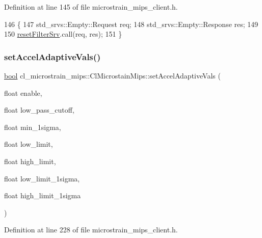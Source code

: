 Definition at line 145 of file microstrain\+\_\+mips\+\_\+client.\+h.


\begin{DoxyCode}
146     \{
147         std\_srvs::Empty::Request req;
148         std\_srvs::Empty::Response res;
149 
150         \hyperlink{classcl__microstrain__mips_1_1ClMicrostainMips_a3d9eb5c291d70a2fb1b9bde4392e1d48}{resetFilterSrv}.call(req, res);
151     \}
\end{DoxyCode}
\mbox{\label{classcl__microstrain__mips_1_1ClMicrostainMips_a4687c5a4ea6de01c41d96f3aeb58fa24}} 
\subsubsection{\texorpdfstring{set\+Accel\+Adaptive\+Vals()}{setAccelAdaptiveVals()}}
{\footnotesize\ttfamily \hyperlink{classbool}{bool} cl\+\_\+microstrain\+\_\+mips\+::\+Cl\+Microstain\+Mips\+::set\+Accel\+Adaptive\+Vals (\begin{DoxyParamCaption}\item[{float}]{enable,  }\item[{float}]{low\+\_\+pass\+\_\+cutoff,  }\item[{float}]{min\+\_\+1sigma,  }\item[{float}]{low\+\_\+limit,  }\item[{float}]{high\+\_\+limit,  }\item[{float}]{low\+\_\+limit\+\_\+1sigma,  }\item[{float}]{high\+\_\+limit\+\_\+1sigma }\end{DoxyParamCaption})\hspace{0.3cm}{\ttfamily [inline]}}



Definition at line 228 of file microstrain\+\_\+mips\+\_\+client.\+h.


